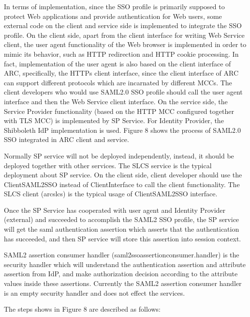 \documentclass{book}
\begin{document}
    In terms of implementation, since the SSO profile is primarily supposed to protect Web applications and provide authentication for Web users, some external code on the client and service side is implemented to integrate the SSO profile. On the client side, apart from the client interface for writing Web Service client, the user agent functionality of the Web browser is implemented in order to mimic its behavior, such as HTTP redirection and HTTP cookie processing. In fact, implementation of the user agent is also based on the client interface of ARC, specifically, the HTTPs client interface, since the client interface of ARC can support different protocols which are incarnated by different MCCs. The client developers who would use SAML2.0 SSO profile should call the user agent interface and then the Web Service client interface. On the service side, the Service Provider functionality (based on the HTTP MCC configured together with TLS MCC) is implemented by SP Service. For Identity Provider, the Shibboleth IdP implementation is used. Figure 8 shows the process of SAML2.0 SSO integrated in ARC client and service.

   Normally SP service will not be deployed independently, instead, it should be deployed together with other services. The SLCS service is the typical deployment about SP service. On the client side, client developer should use the ClientSAML2SSO instead of ClientInterface to call the client functionality. The SLCS client (arcslcs) is the typical usage of  ClientSAML2SSO interface.

    Once the SP Service has cooperated with user agent and Identity Provider (external) and succeeded to accomplish the SAML2 SSO profile,  the SP service will get the saml authentication assertion which asserts that the authentication has succeeded, and then SP service will store this assertion into session context.

    SAML2 assertion consumer handler (saml2ssoassertionconsumer.handler) is the security handler which will understand the authentication assertion and attribute assertion from IdP, and make authorization decision according to the attribute values inside these assertions. Currently the SAML2 assertion consumer handler is an empty security handler and does not effect the services.


The steps shows in Figure 8 are described as follows:
\end{document}
